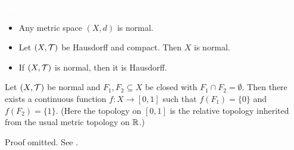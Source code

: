 \documentclass{article}
\begin{document}
\begin{example}
\textcolor{white}{Skip}
\begin{itemize}
    \item Any metric space $(X,d)$ is normal.
    \item Let $(X,\mathcal{T})$ be Hausdorff and compact. Then $X$ is normal.
    \item If $(X,\mathcal{T})$ is normal, then it is Hausdorff. 
\end{itemize}
\end{example}

\begin{theorem}
Let $(X,\mathcal{T})$ be normal and $F_1,F_2\subseteq X$ be closed with $F_1\cap F_2 = \emptyset$. Then there exists a continuous function $f\colon X \to [0,1]$ such that $f(F_1) = \{0\}$ and $f(F_2) = \{1\}$. (Here the topology on $[0,1]$ is the relative topology inherited from the usual metric topology on ${\mathbb{R}}$.)
\end{theorem}

Proof omitted. See \cite[Theorem 4.1.2]{tastetopology}.
\end{document}
